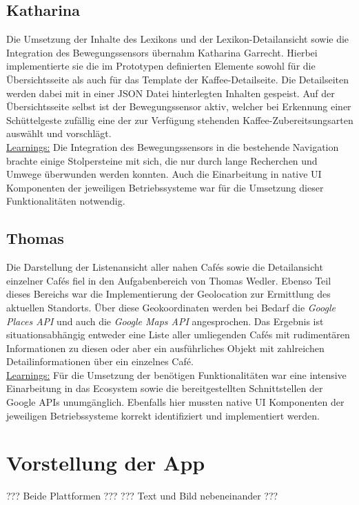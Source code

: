 \subsection{Katharina}
Die Umsetzung der Inhalte des Lexikons und der Lexikon-Detailansicht sowie die Integration des Bewegungssensors übernahm Katharina Garrecht.
Hierbei implementierte sie die im Prototypen definierten Elemente sowohl für die Übersichtsseite als auch für das Template der Kaffee-Detailseite.
Die Detailseiten werden dabei mit in einer JSON Datei hinterlegten Inhalten gespeist.
Auf der Übersichtsseite selbst ist der Bewegungssensor aktiv, welcher bei Erkennung einer Schüttelgeste zufällig eine der zur Verfügung stehenden Kaffee-Zubereitsungsarten auswählt und vorschlägt.
\\
\underline{Learnings:}
Die Integration des Bewegungssensors in die bestehende Navigation brachte einige Stolpersteine mit sich, die nur durch lange Recherchen und Umwege überwunden werden konnten.
Auch die Einarbeitung in native UI Komponenten der jeweiligen Betriebssysteme war für die Umsetzung dieser Funktionalitäten notwendig.

\subsection{Thomas}
Die Darstellung der Listenansicht aller nahen Cafés sowie die Detailansicht einzelner Cafés fiel in den Aufgabenbereich von Thomas Wedler.
Ebenso Teil dieses Bereichs war die Implementierung der Geolocation zur Ermittlung des aktuellen Standorts.
Über diese Geokoordinaten werden bei Bedarf die \emph{Google Places API} und auch die \emph{Google Maps API} angesprochen.
Das Ergebnis ist situationsabhängig entweder eine Liste aller umliegenden Cafés mit rudimentären Informationen zu diesen oder aber ein ausführliches Objekt mit zahlreichen Detailinformationen über ein einzelnes Café.
\\
\underline{Learnings:}
Für die Umsetzung der benötigen Funktionalitäten war eine intensive Einarbeitung in das Ecosystem sowie die bereitgestellten Schnittstellen der Google APIs unumgänglich.
Ebenfalls hier mussten native UI Komponenten der jeweiligen Betriebssysteme korrekt identifiziert und implementiert werden.



\section{Vorstellung der App}
??? Beide Plattformen ???
??? Text und Bild nebeneinander ???

